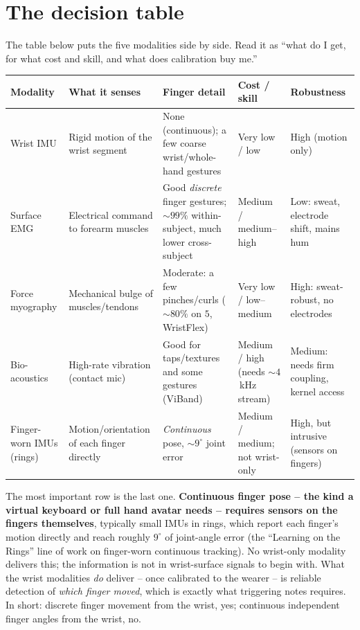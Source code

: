 \section{The decision table}
\label{ch37:decision}

The table below puts the five modalities side by side. Read it as ``what do I get, for what cost and skill, and
what does calibration buy me.''

\begin{center}
\renewcommand{\arraystretch}{1.35}
\begin{longtable}{p{2.6cm} p{3.2cm} p{2.4cm} p{2.2cm} p{2.4cm}}
\toprule
\textbf{Modality} & \textbf{What it senses} & \textbf{Finger detail} & \textbf{Cost / skill} & \textbf{Robustness} \\
\midrule
\endhead
Wrist IMU
 & Rigid motion of the wrist segment
 & None (continuous); a few coarse wrist/whole-hand gestures
 & Very low / low
 & High (motion only) \\
Surface EMG
 & Electrical command to forearm muscles
 & Good \emph{discrete} finger gestures; $\sim 99\%$ within-subject, much lower cross-subject
 & Medium / medium--high
 & Low: sweat, electrode shift, mains hum \\
Force myography
 & Mechanical bulge of muscles/tendons
 & Moderate: a few pinches/curls ($\sim 80\%$ on $5$, WristFlex)
 & Very low / low--medium
 & High: sweat-robust, no electrodes \\
Bio-acoustics
 & High-rate vibration (contact mic)
 & Good for taps/textures and some gestures (ViBand)
 & Medium / high (needs $\sim 4$\,kHz stream)
 & Medium: needs firm coupling, kernel access \\
Finger-worn IMUs (rings)
 & Motion/orientation of each finger directly
 & \emph{Continuous} pose, $\sim 9^{\circ}$ joint error
 & Medium / medium; not wrist-only
 & High, but intrusive (sensors on fingers) \\
\bottomrule
\end{longtable}
\end{center}

\begin{focusbox}
The most important row is the last one. \textbf{Continuous finger pose --
the kind a virtual keyboard or full hand avatar needs -- requires sensors on the
fingers themselves}, typically small IMUs in rings, which report each finger's motion
directly and reach roughly $9^{\circ}$ of joint-angle error (the ``Learning on the
Rings'' line of work on finger-worn continuous tracking). No wrist-only modality
delivers this; the information is not in wrist-surface signals to begin with. What the
wrist modalities \emph{do} deliver -- once calibrated to the wearer -- is reliable
detection of \emph{which finger moved}, which is exactly what triggering notes
requires. In short: discrete finger movement from the
wrist, yes; continuous independent finger angles from the wrist, no.
\end{focusbox}

